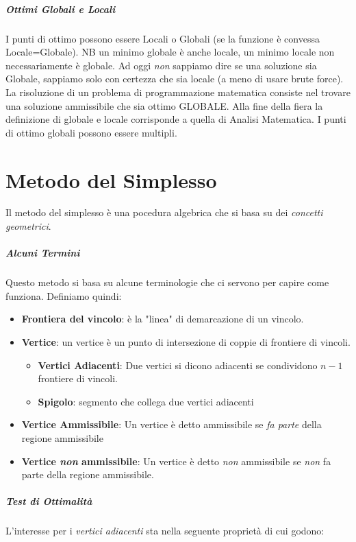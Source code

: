 \documentclass[12pt, a4paper, openany]{book}
\begin{document}
\paragraph*{Ottimi Globali e Locali}
I punti di ottimo possono essere Locali o Globali (se la funzione è convessa Locale=Globale). NB un minimo globale è anche locale, un minimo locale non necessariamente è globale.
Ad oggi \emph{non} sappiamo dire se una soluzione sia Globale, sappiamo solo con certezza che sia locale (a meno di usare brute force).
\\La risoluzione di un problema di programmazione matematica consiste nel trovare una soluzione ammissibile che sia ottimo GLOBALE.
Alla fine della fiera la definizione di globale e locale corrisponde a quella di Analisi Matematica.
I punti di ottimo globali possono essere multipli.

\chapter{Metodo del Simplesso}
Il metodo del simplesso è una pocedura algebrica che si basa su dei \emph{concetti geometrici}.
\paragraph*{Alcuni Termini}
Questo metodo si basa su alcune terminologie che ci servono per capire come funziona.
Definiamo quindi:
\begin{itemize}
    \item \textbf{Frontiera del vincolo}: è la "linea" di demarcazione di un vincolo.
    \item \textbf{Vertice}: un vertice è un punto di intersezione di coppie di frontiere di vincoli.
    \begin{itemize}
        \item \textbf{Vertici Adiacenti}: Due vertici si dicono adiacenti se condividono $n-1$ frontiere di vincoli.
        \item \textbf{Spigolo}: segmento che collega due vertici adiacenti
    \end{itemize}
    \item \textbf{Vertice Ammissibile}: Un vertice è detto ammissibile se \emph{fa parte} della regione ammissibile
    \item \textbf{Vertice \emph{non} ammissibile}: Un vertice è detto \emph{non} ammissibile se \emph{non} fa parte della regione ammissibile.
\end{itemize}
\paragraph*{Test di Ottimalità}
L'interesse per i \emph{vertici adiacenti} sta nella seguente proprietà di cui godono:
\end{document}
